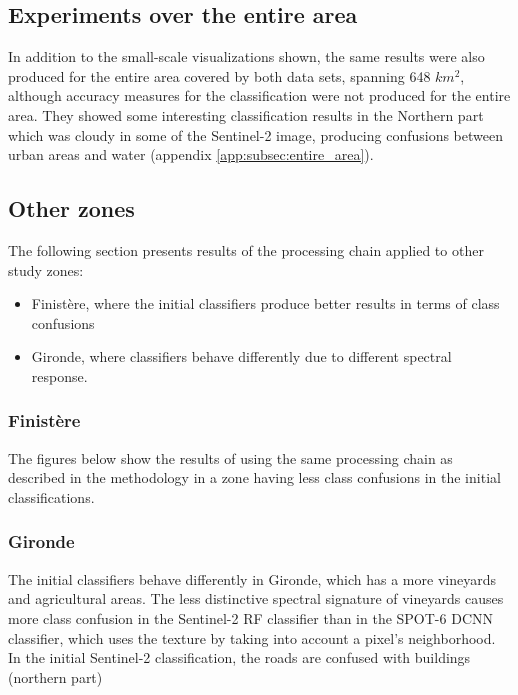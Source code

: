 \documentclass[10pt]{article}
\newcommand{\tile}{41000_30000}
\newcommand{\region}{finistere}
\begin{document}
\subsection{Experiments over the entire area}
In addition to the small-scale visualizations shown, the same results were also produced for the entire area covered by both data sets, spanning 648 $km^2$, although accuracy measures for the classification were not produced for the entire area. They showed some interesting classification results in the Northern part which was cloudy in some of the Sentinel-2 image, producing confusions between urban areas and water (appendix \ref{app:subsec:entire_area}).

\subsection{Other zones}\label{subsec:otherZones}
The following section presents results of the processing chain applied to other study zones:
\begin{itemize}
    \item Finistère, where the initial classifiers produce better results in terms of class confusions
    \item Gironde, where classifiers behave differently due to different spectral response.  
\end{itemize}
\subsubsection{Finistère}
The figures below show the results of using the same processing chain as described in the methodology in a zone having less class confusions in the initial classifications.

\renewcommand{\tile}{35000_40000}
\figureTile
\figureGT
\figureOrigClass
\figureFusionRegul
\figureBinRegulSeg

\subsubsection{Gironde}
\renewcommand{\region}{gironde}
\renewcommand{\tile}{10500_34500}
\figureTile
\figureGT
\figureOrigClass

The initial classifiers behave differently in Gironde, which has a more vineyards and agricultural areas. The less distinctive spectral signature of vineyards causes more class confusion in the Sentinel-2 RF classifier than in the SPOT-6 DCNN classifier, which uses the texture by taking into account a pixel's neighborhood. In the initial Sentinel-2 classification, the roads are confused with buildings (northern part)
\end{document}
